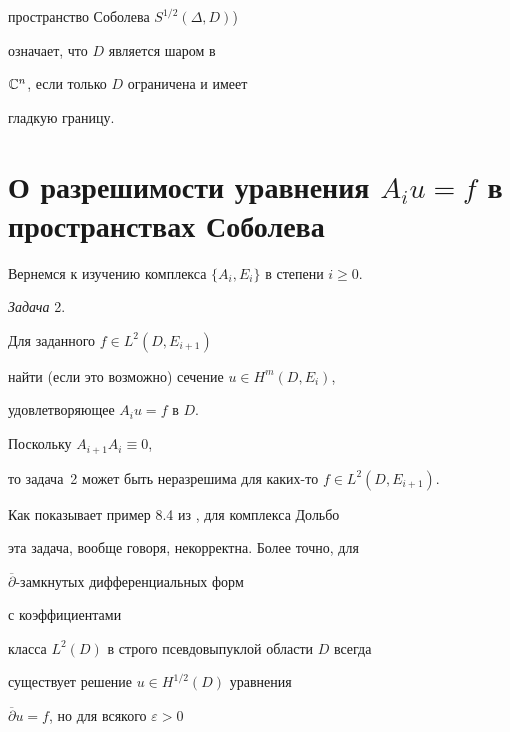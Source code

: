 пространство Соболева $S^{1/2} (\Delta, D)$)


означает, что $D$ является шаром в


${\Bbb C}^n$, если только $D$ ограничена и имеет


гладкую границу.











\section{О разрешимости уравнения $A_i u=f$ в пространствах Соболева}


\label{S.A}





Вернемся к изучению комплекса $\{ A_i, E_i\}$ в степени $i\geq 0$.


\medskip





{\it Задача} 2.




Для заданного $f \in L^{2} (D, E_{i+1})$


найти (если это возможно) сечение $u \in H^{m} (D, E_i)$,


удовлетворяющее $A_i u=f$ в $D$.


\medskip





Поскольку $A_{i+1} A_i \equiv 0$,


то задача~2 может быть неразрешима для каких-то $f \in


L^2 (D,E_{i+1})$.





Как показывает пример 8.4 из \cite{NaSh}, для комплекса Дольбо


эта задача, вообще говоря, некорректна. Более точно, для


$\overline \partial$-замкнутых дифференциальных форм


с коэффициентами


класса $L^2 (D)$ в строго псевдовыпуклой области $D$ всегда


существует решение $u \in H^{1/2} (D)$ уравнения


$\overline \partial u =f $, но для всякого $\varepsilon >0$


